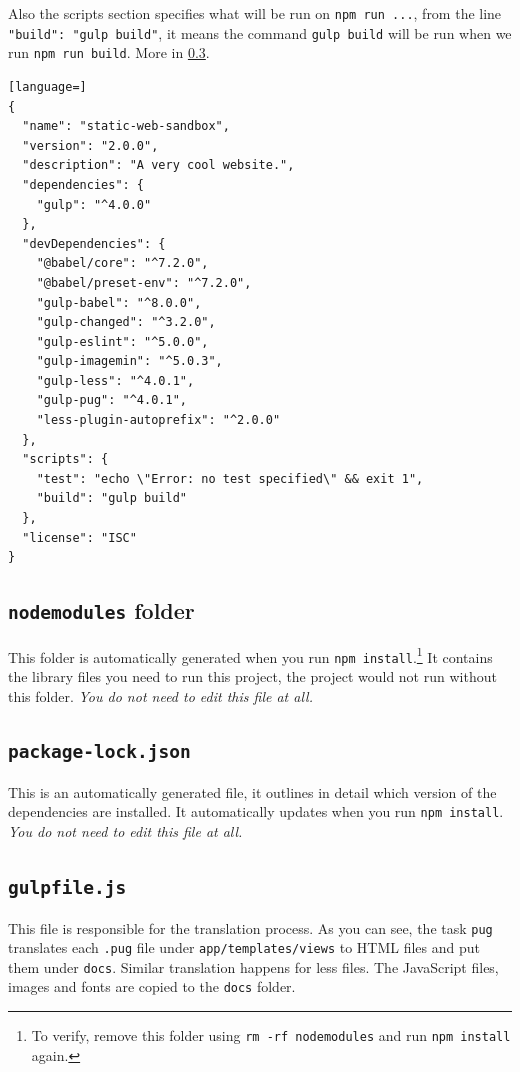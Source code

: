 Also the scripts section specifies what will be run on \texttt{npm run ...}, from the line \texttt{"build": "gulp build"}, it means the command \texttt{gulp build} will be run when we run \texttt{npm run build}. More in \cref{sec:gulpfile}.

\begin{lstlisting}[language=]
{
  "name": "static-web-sandbox",
  "version": "2.0.0",
  "description": "A very cool website.",
  "dependencies": {
    "gulp": "^4.0.0"
  },
  "devDependencies": {
    "@babel/core": "^7.2.0",
    "@babel/preset-env": "^7.2.0",
    "gulp-babel": "^8.0.0",
    "gulp-changed": "^3.2.0",
    "gulp-eslint": "^5.0.0",
    "gulp-imagemin": "^5.0.3",
    "gulp-less": "^4.0.1",
    "gulp-pug": "^4.0.1",
    "less-plugin-autoprefix": "^2.0.0"
  },
  "scripts": {
    "test": "echo \"Error: no test specified\" && exit 1",
    "build": "gulp build"
  },
  "license": "ISC"
}
\end{lstlisting}

\subsection{\texttt{node\textunderscore modules} folder}

This folder is automatically generated when you run \texttt{npm install}.\footnote{To verify, remove this folder using \texttt{rm -rf node\textunderscore modules} and run \texttt{npm install} again.} It contains the library files you need to run this project, the project would not run without this folder. \textit{You do not need to edit this file at all.}

\subsection{\texttt{package-lock.json}}

This is an automatically generated file, it outlines in detail which version of the dependencies are installed. It automatically updates when you run \texttt{npm install}. \textit{You do not need to edit this file at all.}

\subsection{\texttt{gulpfile.js}}
\label{sec:gulpfile}

This file is responsible for the translation process. As you can see, the task \texttt{pug} translates each \texttt{.pug} file under \texttt{app/templates/views} to HTML files and put them under \texttt{docs}. Similar translation happens for less files. The JavaScript files, images and fonts are copied to the \texttt{docs} folder.

